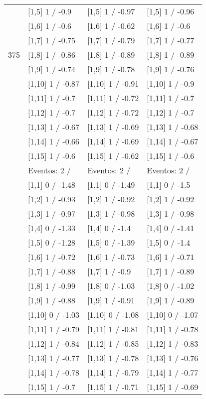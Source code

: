 \begin{table}
\begin{tabular}[t]{llll}
 & {}[1,5] 1  / -0.9 & {}[1,5] 1  / -0.97 & {}[1,5] 1  / -0.96\\
 & {}[1,6] 1  / -0.6 & {}[1,6] 1  / -0.62 & {}[1,6] 1  / -0.6\\
 & {}[1,7] 1  / -0.75 & {}[1,7] 1  / -0.79 & {}[1,7] 1  / -0.77\\
375 & {}[1,8] 1  / -0.86 & {}[1,8] 1  / -0.89 & {}[1,8] 1  / -0.89\\
\addlinespace
 & {}[1,9] 1  / -0.74 & {}[1,9] 1  / -0.78 & {}[1,9] 1  / -0.76\\
 & {}[1,10] 1  / -0.87 & {}[1,10] 1  / -0.91 & {}[1,10] 1  / -0.9\\
 & {}[1,11] 1  / -0.7 & {}[1,11] 1  / -0.72 & {}[1,11] 1  / -0.7\\
 & {}[1,12] 1  / -0.7 & {}[1,12] 1  / -0.72 & {}[1,12] 1  / -0.7\\
 & {}[1,13] 1  / -0.67 & {}[1,13] 1  / -0.69 & {}[1,13] 1  / -0.68\\
\addlinespace
 & {}[1,14] 1  / -0.66 & {}[1,14] 1  / -0.69 & {}[1,14] 1  / -0.67\\
 & {}[1,15] 1  / -0.6 & {}[1,15] 1  / -0.62 & {}[1,15] 1  / -0.6\\
 & Eventos:  2 / & Eventos:  2 / & Eventos:  2 /\\
 & {}[1,1] 0  / -1.48 & {}[1,1] 0  / -1.49 & {}[1,1] 0  / -1.5\\
 & {}[1,2] 1  / -0.93 & {}[1,2] 1  / -0.92 & {}[1,2] 1  / -0.92\\
\addlinespace
 & {}[1,3] 1  / -0.97 & {}[1,3] 1  / -0.98 & {}[1,3] 1  / -0.98\\
 & {}[1,4] 0  / -1.33 & {}[1,4] 0  / -1.4 & {}[1,4] 0  / -1.41\\
 & {}[1,5] 0  / -1.28 & {}[1,5] 0  / -1.39 & {}[1,5] 0  / -1.4\\
 & {}[1,6] 1  / -0.72 & {}[1,6] 1  / -0.73 & {}[1,6] 1  / -0.71\\
 & {}[1,7] 1  / -0.88 & {}[1,7] 1  / -0.9 & {}[1,7] 1  / -0.89\\
\addlinespace
500 & {}[1,8] 1  / -0.99 & {}[1,8] 0  / -1.03 & {}[1,8] 0  / -1.02\\
 & {}[1,9] 1  / -0.88 & {}[1,9] 1  / -0.91 & {}[1,9] 1  / -0.89\\
 & {}[1,10] 0  / -1.03 & {}[1,10] 0  / -1.08 & {}[1,10] 0  / -1.07\\
 & {}[1,11] 1  / -0.79 & {}[1,11] 1  / -0.81 & {}[1,11] 1  / -0.78\\
 & {}[1,12] 1  / -0.84 & {}[1,12] 1  / -0.85 & {}[1,12] 1  / -0.83\\
\addlinespace
 & {}[1,13] 1  / -0.77 & {}[1,13] 1  / -0.78 & {}[1,13] 1  / -0.76\\
 & {}[1,14] 1  / -0.78 & {}[1,14] 1  / -0.79 & {}[1,14] 1  / -0.77\\
 & {}[1,15] 1  / -0.7 & {}[1,15] 1  / -0.71 & {}[1,15] 1  / -0.69\\
\bottomrule
\end{tabular}
\end{table}
